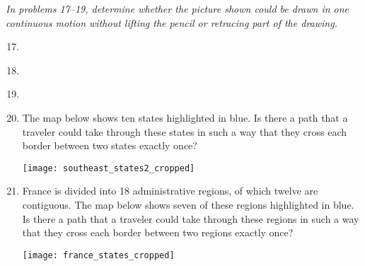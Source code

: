 \emph{In problems 17--19, determine whether the picture shown could be drawn in one continuous motion without lifting the pencil or retracing part of the drawing.}
\begin{enumerate}
\setcounter{enumi}{16}

\item \begin{center} %
\end{center}

\item \begin{center} %
\end{center}

\item \begin{center} %
\end{center}

\item The map below shows ten states highlighted in blue.  Is there a path that a traveler could take through these states in such a way that they cross each border between two states exactly once?
\begin{center}
\texttt{[image: southeast\_states2\_cropped]}
\end{center}

\item France is divided into 18 administrative regions, of which twelve are contiguous.  The map below shows seven of these regions highlighted in blue.  Is there a path that a traveler could take through these regions in such a way that they cross each border between two regions exactly once?
\begin{center}
\texttt{[image: france\_states\_cropped]}
\end{center}
\end{enumerate}

